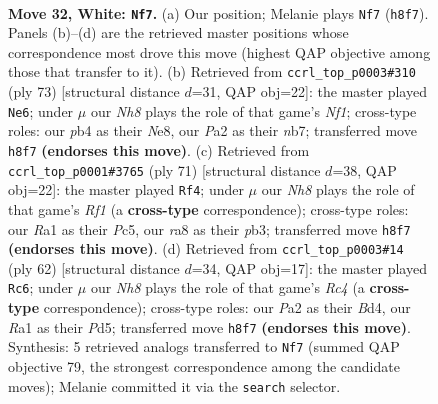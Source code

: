 \documentclass[11pt]{article}
\begin{document}
\clearpage

\begin{figure}[p]\centering
\begin{subfigure}{0.46\textwidth}\centering
\resizebox{\linewidth}{!}{%
\newchessgame
\chessboard[
  setfen={r1k3nN/3n4/8/p5p1/1p2bb1p/7P/P4KP1/R7 w - - 0 32},
  showmover=false,
  pgfstyle=straightmove, color=movearrow, markmove={h8-f7}
]}
\caption{}
\end{subfigure}\hfill
\begin{subfigure}{0.46\textwidth}\centering
\resizebox{\linewidth}{!}{%
\newchessgame
\chessboard[
  setfen={4nn1k/1N4p1/2p4p/1p6/1P6/3B1K1P/r1P3P1/1R6 b - - 0 37},
  showmover=false,
  pgfstyle=straightmove, color=movearrow, markmove={f8-e6}
]}
\caption{}
\end{subfigure}
\\[4pt]
\begin{subfigure}{0.46\textwidth}\centering
\resizebox{\linewidth}{!}{%
\newchessgame
\chessboard[
  setfen={5r1k/1p5p/p7/P1p4P/2B5/1P3P2/3r4/R5NK b - - 0 36},
  showmover=false,
  pgfstyle=straightmove, color=movearrow, markmove={f8-f4}
]}
\caption{}
\end{subfigure}\hfill
\begin{subfigure}{0.46\textwidth}\centering
\resizebox{\linewidth}{!}{%
\newchessgame
\chessboard[
  setfen={r5k1/4p2p/3b2p1/1P1P1p2/2RB4/6P1/7P/6K1 w - - 0 32},
  showmover=false,
  pgfstyle=straightmove, color=movearrow, markmove={c4-c6}
]}
\caption{}
\end{subfigure}
\caption{\textbf{Move 32, White: \texttt{Nf7}.} (a) Our position; Melanie plays \texttt{Nf7} (\texttt{h8f7}). Panels (b)--(d) are the retrieved master positions whose correspondence most drove this move (highest QAP objective among those that transfer to it). (b) Retrieved from \texttt{ccrl\_top\_p0003\#310} (ply 73) [structural distance $d$=31, QAP obj=22]: the master played \texttt{Ne6}; under $\mu$ our \emph{Nh8} plays the role of that game's \emph{Nf1}; cross-type roles: our \emph{p}b4 as their \emph{N}e8, our \emph{P}a2 as their \emph{n}b7; transferred move \texttt{h8f7} \textbf{(endorses this move)}. (c) Retrieved from \texttt{ccrl\_top\_p0001\#3765} (ply 71) [structural distance $d$=38, QAP obj=22]: the master played \texttt{Rf4}; under $\mu$ our \emph{Nh8} plays the role of that game's \emph{Rf1} (a \textbf{cross-type} correspondence); cross-type roles: our \emph{R}a1 as their \emph{P}c5, our \emph{r}a8 as their \emph{p}b3; transferred move \texttt{h8f7} \textbf{(endorses this move)}. (d) Retrieved from \texttt{ccrl\_top\_p0003\#14} (ply 62) [structural distance $d$=34, QAP obj=17]: the master played \texttt{Rc6}; under $\mu$ our \emph{Nh8} plays the role of that game's \emph{Rc4} (a \textbf{cross-type} correspondence); cross-type roles: our \emph{P}a2 as their \emph{B}d4, our \emph{R}a1 as their \emph{P}d5; transferred move \texttt{h8f7} \textbf{(endorses this move)}. Synthesis: 5 retrieved analogs transferred to \texttt{Nf7} (summed QAP objective 79, the strongest correspondence among the candidate moves); Melanie committed it via the \texttt{search} selector.}
\label{fig:thought-m62}
\end{figure}
\end{document}

